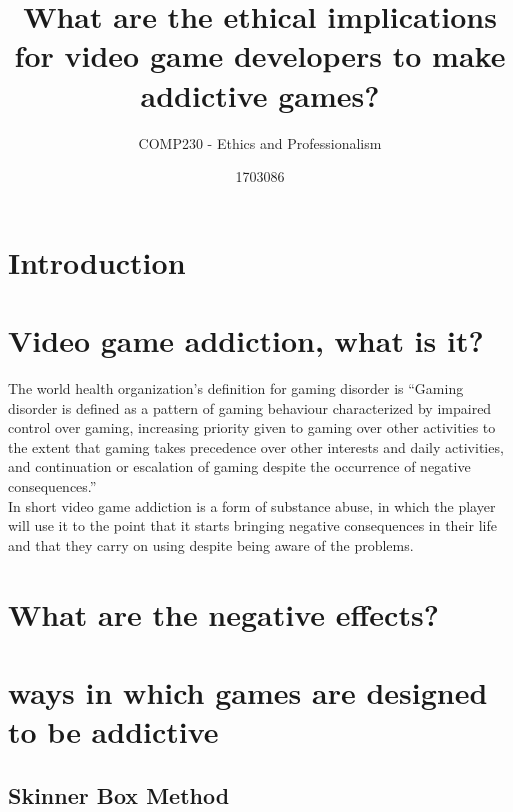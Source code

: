 \documentclass{scrartcl}
\title{What are the ethical implications for video game developers to make addictive games?}
\subtitle{COMP230 - Ethics and Professionalism}
\author{1703086}
\begin{document}
\maketitle


\section{Introduction}

\section{Video game addiction, what is it?}
The world health organization's definition for gaming disorder is “Gaming disorder is defined as a pattern of gaming behaviour characterized by impaired control over gaming, increasing priority given to gaming over other activities to the extent that gaming takes precedence over other interests and daily activities, and continuation or escalation of gaming despite the occurrence of negative consequences.”
\\
In short video game addiction is a form of substance abuse, in which the player will use it to the point that it starts bringing negative consequences in their life and that they carry on using despite being aware of the problems.


\section{What are the negative effects?}

\section{ways in which games are designed to be addictive}

\subsection{Skinner Box Method}
\end{document}
